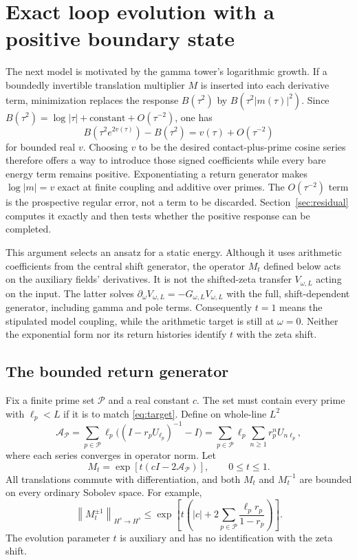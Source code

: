 \documentclass[11pt]{article}
\numberwithin{equation}{section}
\theoremstyle{definition}
\theoremstyle{remark}
\newcommand{\norm}[1]{\left\lVert#1\right\rVert}
\begin{document}
\section{Exact loop evolution with a positive boundary state}
\label{sec:evolution}
The next model is motivated by the gamma tower's logarithmic growth. If a boundedly invertible translation multiplier $M$ is inserted into each derivative term, minimization replaces the response $B(\tau^2)$ by $B(\tau^2|m(\tau)|^2)$. Since $B(\tau^2)=\log|\tau|+\text{constant}+O(\tau^{-2})$, one has
\[
B(\tau^2e^{2v(\tau)})-B(\tau^2)
=v(\tau)+O(\tau^{-2})
\]
for bounded real $v$. Choosing $v$ to be the desired contact-plus-prime cosine series therefore offers a way to introduce those signed coefficients while every bare energy term remains positive. Exponentiating a return generator makes $\log|m|=v$ exact at finite coupling and additive over primes. The $O(\tau^{-2})$ term is the prospective regular error, not a term to be discarded. Section~\ref{sec:residual} computes it exactly and then tests whether the positive response can be completed.

This argument selects an ansatz for a static energy. Although it uses arithmetic coefficients from the central shift generator, the operator $M_t$ defined below acts on the auxiliary fields' derivatives. It is not the shifted-zeta transfer $V_{\omega,L}$ acting on the input. The latter solves $\partial_\omega V_{\omega,L}=-G_{\omega,L}V_{\omega,L}$ with the full, shift-dependent generator, including gamma and pole terms. Consequently $t=1$ means the stipulated model coupling, while the arithmetic target is still at $\omega=0$. Neither the exponential form nor its return histories identify $t$ with the zeta shift.

\subsection{The bounded return generator}
Fix a finite prime set $\mathcal P$ and a real constant $c$. The set must contain every prime with $\ell_p<L$ if it is to match \eqref{eq:target}. Define on whole-line $L^2$
\begin{equation}
 \mathcal A_{\mathcal P}=
 \sum_{p\in\mathcal P}\ell_p\bigl((I-r_pU_{\ell_p})^{-1}-I\bigr)
 =\sum_{p\in\mathcal P}\ell_p\sum_{n\ge1}r_p^nU_{n\ell_p},
\end{equation}
where each series converges in operator norm. Let
\begin{equation}
 M_t=\exp[t(cI-2\mathcal A_{\mathcal P})],\qquad0\le t\le1.
 \label{eq:Mt}
\end{equation}
All translations commute with differentiation, and both $M_t$ and $M_t^{-1}$ are bounded on every ordinary Sobolev space. For example,
\begin{equation}
 \norm{M_t^{\pm1}}_{H^s\to H^s}
 \le\exp\left[t\left(|c|+2\sum_{p\in\mathcal P}
 \frac{\ell_pr_p}{1-r_p}\right)\right].
 \label{eq:Mbound}
\end{equation}
The evolution parameter $t$ is auxiliary and has no identification with the zeta shift.
\end{document}

